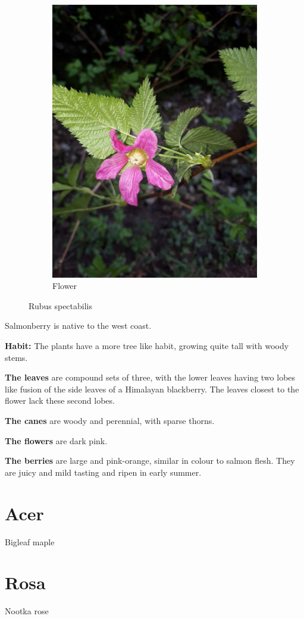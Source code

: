 \begin{figure}
\begin{subfigure}{0.48\textwidth}
    \includegraphics[width=\textwidth]{rubus/spectabilis_flower_01}
    \caption{Flower}
    \label{fig:rub:spectabilis:berry}
\end{subfigure}

        
\caption{Rubus spectabilis}
\label{fig:rub:spectabilis}
\end{figure}

Salmonberry is native to the west coast.

\textbf{Habit:} The plants have a more tree like habit, growing quite tall with woody stems.

\textbf{The leaves} are compound sets of three, with the lower leaves having two lobes like fusion of the side leaves of a Himalayan blackberry. The leaves closest to the flower lack these second lobes.

\textbf{The canes} are woody and perennial, with sparse thorns.

\textbf{The flowers} are dark pink.

\textbf{The berries} are large and pink-orange, similar in colour to salmon flesh. They are juicy and mild tasting and ripen in early summer.


\section{Acer}

Bigleaf maple

\section{Rosa}

Nootka rose

